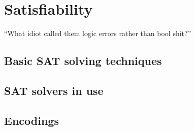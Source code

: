 \renewcommand*\chappic{satisfiability.pdf_tex}
\chapter{Satisfiability}
\label{ch:sat-solving}
\vspace{50pt}

\enquote{What idiot called them logic errors rather than bool shit?}

\section{Basic SAT solving techniques}
\section{SAT solvers in use}
\section{Encodings}

